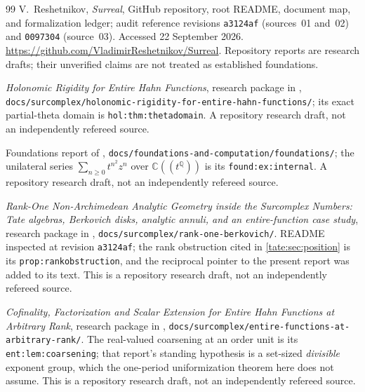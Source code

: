 \documentclass[11pt,letterpaper]{article}
\theoremstyle{definition}
\newcommand{\C}{\mathbb C}
\newcommand{\Q}{\mathbb Q}
\newcommand{\file}[1]{\nolinkurl{#1}}
\begin{document}
\begin{thebibliography}{99}
V.~Reshetnikov, \emph{Surreal}, GitHub repository,
root README, document map, and formalization ledger;
audit reference revisions \texttt{a3124af} (sources~01 and~02) and
\texttt{0097304} (source~03).
Accessed 22 September 2026.
\url{https://github.com/VladimirReshetnikov/Surreal}.
Repository reports are research drafts; their unverified claims are not
treated as established foundations.

\emph{Holonomic Rigidity for Entire Hahn Functions}, research package in
\cite{Repo}, \file{docs/surcomplex/holonomic-rigidity-for-entire-hahn-functions/};
its exact partial-theta domain is \texttt{hol:thm:thetadomain}. A repository
research draft, not an independently refereed source.

Foundations report of \cite{Repo},
\file{docs/foundations-and-computation/foundations/}; the unilateral
series $\sum_{n\ge0}t^{n^2}z^n$ over $\C((t^\Q))$ is its
\texttt{found:ex:internal}. A repository research draft, not an
independently refereed source.

\emph{Rank-One Non-Archimedean Analytic Geometry inside the Surcomplex
Numbers: Tate algebras, Berkovich disks, analytic annuli, and an
entire-function case study}, research package in \cite{Repo},
\file{docs/surcomplex/rank-one-berkovich/}.
README inspected at revision \texttt{a3124af}; the rank obstruction cited
in \cref{tate:sec:position} is its \texttt{prop:rankobstruction}, and the
reciprocal pointer to the present report was added to its text.
This is a repository research draft, not an independently refereed source.

\emph{Cofinality, Factorization and Scalar Extension for Entire Hahn
Functions at Arbitrary Rank}, research package in \cite{Repo},
\texttt{docs/surcomplex/entire-functions-at-arbitrary-rank/}.
The real-valued coarsening at an order unit is its
\texttt{ent:lem:coarsening}; that report's standing hypothesis is a
set-sized \emph{divisible} exponent group, which the one-period
uniformization theorem here does not assume. This is a repository research draft, not an independently
refereed source.

\end{thebibliography}
\end{document}
